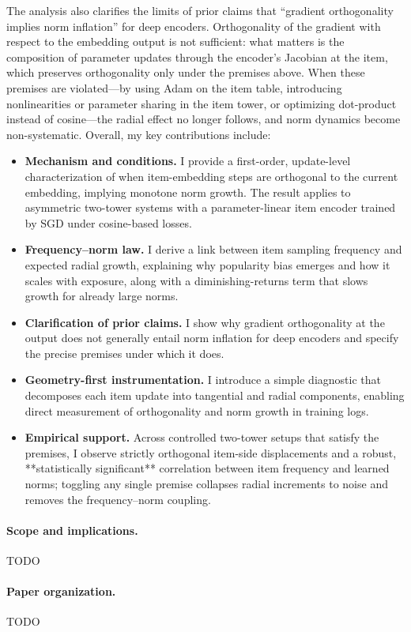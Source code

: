 The analysis also clarifies the limits of prior claims that “gradient orthogonality implies norm inflation” for deep encoders. Orthogonality of the gradient with respect to the embedding output is not sufficient: what matters is the composition of parameter updates through the encoder’s Jacobian at the item, which preserves orthogonality only under the premises above. When these premises are violated—by using Adam on the item table, introducing nonlinearities or parameter sharing in the item tower, or optimizing dot-product instead of cosine—the radial effect no longer follows, and norm dynamics become non-systematic. Overall, my key contributions include:

\begin{itemize}
  \item \textbf{Mechanism and conditions.} I provide a first-order, update-level characterization of when item-embedding steps are orthogonal to the current embedding, implying monotone norm growth. The result applies to asymmetric two-tower systems with a parameter-linear item encoder trained by SGD under cosine-based losses.
  \item \textbf{Frequency–norm law.} I derive a link between item sampling frequency and expected radial growth, explaining why popularity bias emerges and how it scales with exposure, along with a diminishing-returns term that slows growth for already large norms.
  \item \textbf{Clarification of prior claims.} I show why gradient orthogonality at the output does not generally entail norm inflation for deep encoders and specify the precise premises under which it does.
  \item \textbf{Geometry-first instrumentation.} I introduce a simple diagnostic that decomposes each item update into tangential and radial components, enabling direct measurement of orthogonality and norm growth in training logs.
  \item \textbf{Empirical support.} Across controlled two-tower setups that satisfy the premises, I observe strictly orthogonal item-side displacements and a robust, **statistically significant** correlation between item frequency and learned norms; toggling any single premise collapses radial increments to noise and removes the frequency–norm coupling.
\end{itemize}

\paragraph{Scope and implications.} TODO

\paragraph{Paper organization.} TODO